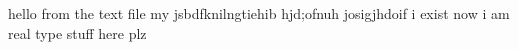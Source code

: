 hello from the text file
my jsbdfknilngtiehib hjd;ofnuh
josigjhdoif
i exist now
i am real
type stuff here plz
